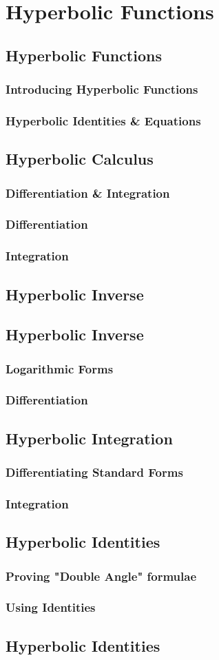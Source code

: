 \documentclass[../maths.tex]{subfiles}
\begin{document}
\chapter{Hyperbolic Functions}
\section{Hyperbolic Functions}
\subsection*{Introducing Hyperbolic Functions}
\subsection*{Hyperbolic Identities \& Equations}
\section{Hyperbolic Calculus}
\subsection*{Differentiation \& Integration}
\subsection*{Differentiation}
\subsection*{Integration}
\section{Hyperbolic Inverse}
\section{Hyperbolic Inverse}
\subsection*{Logarithmic Forms}
\subsection*{Differentiation}
\section{Hyperbolic Integration}
\subsection*{Differentiating Standard Forms}
\subsection*{Integration}
\section{Hyperbolic Identities}
\subsection*{Proving "Double Angle" formulae}
\subsection*{Using Identities}
\section{Hyperbolic Identities}
\end{document}
